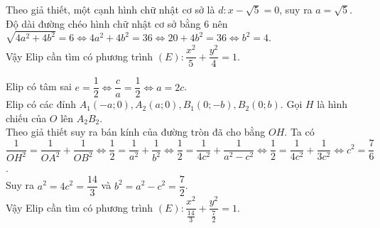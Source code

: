 \begin{bt}
{\begin{listEX}
		Theo giả thiết, một cạnh hình chữ nhật cơ sở là $d\colon x-\sqrt{5}=0$, suy ra $a=\sqrt{5}$.\\
		Độ dài đường chéo hình chữ nhật cơ sở bằng $6$ nên\\
		$\sqrt{4a^2+4b^2}=6 \Leftrightarrow 4a^2+4b^2=36 \Leftrightarrow 20+4b^2=36 \Leftrightarrow b^2=4$.\\
		Vậy Elip cần tìm có phương trình $(E)\colon \dfrac{x^2}{5}+\dfrac{y^2}{4}=1$.\\
		\item Elip có tâm sai $e=\dfrac{1}{2} \Leftrightarrow \dfrac{c}{a}=\dfrac{1}{2} \Leftrightarrow a=2c$.\\
		Elip có các đỉnh $A_1(-a;0), A_2(a;0), B_1(0;-b), B_2(0;b)$. Gọi $H$ là hình chiếu của $O$ lên $A_2B_2$.\\
		Theo giả thiết suy ra bán kính của đường tròn đã cho bằng $OH$. Ta có\\
		$\dfrac{1}{OH^2}=\dfrac{1}{OA^2}+\dfrac{1}{OB^2} \Leftrightarrow \dfrac{1}{2}=\dfrac{1}{a^2}+\dfrac{1}{b^2} \Leftrightarrow \dfrac{1}{2}=\dfrac{1}{4c^2}+\dfrac{1}{a^2-c^2} \Leftrightarrow \dfrac{1}{2}=\dfrac{1}{4c^2}+\dfrac{1}{3c^2} \Leftrightarrow c^2=\dfrac{7}{6}$.\\
		Suy ra $a^2=4c^2=\dfrac{14}{3}$ và $b^2=a^2-c^2=\dfrac{7}{2}$.\\
		Vậy Elip cần tìm có phương trình $(E)\colon \dfrac{x^2}{\tfrac{14}{3}}+\dfrac{y^2}{\tfrac{7}{2}}=1$.
	\end{listEX}
}
\end{bt}

